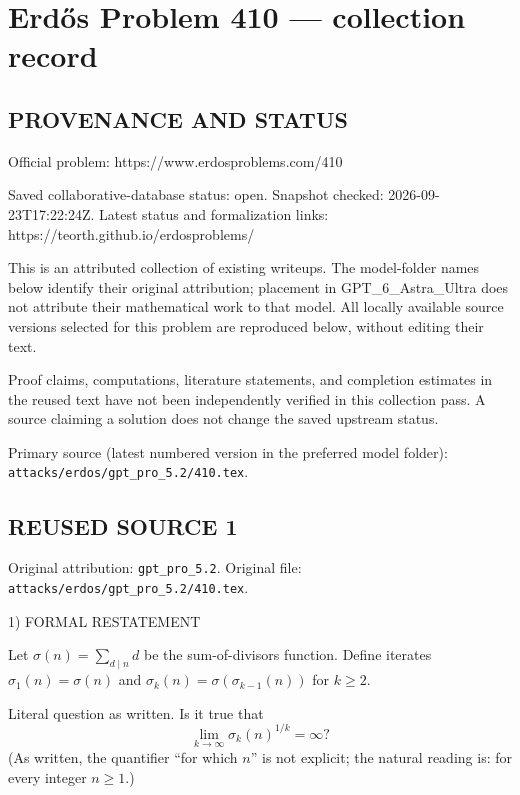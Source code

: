 \section*{Erd\H{o}s Problem 410 --- collection record}

\subsection*{PROVENANCE AND STATUS}
Official problem: https://www.erdosproblems.com/410

Saved collaborative-database status: open.
Snapshot checked: 2026-09-23T17:22:24Z.
Latest status and formalization links: https://teorth.github.io/erdosproblems/

This is an attributed collection of existing writeups. The model-folder names below identify their original attribution; placement in GPT\_6\_Astra\_Ultra does not attribute their mathematical work to that model. All locally available source versions selected for this problem are reproduced below, without editing their text.

Proof claims, computations, literature statements, and completion estimates in the reused text have not been independently verified in this collection pass. A source claiming a solution does not change the saved upstream status.

Primary source (latest numbered version in the preferred model folder): \texttt{attacks/erdos/gpt\_pro\_5.2/410.tex}.

\subsection*{REUSED SOURCE 1}
Original attribution: \texttt{gpt\_pro\_5.2}.
Original file: \texttt{attacks/erdos/gpt\_pro\_5.2/410.tex}.


1) FORMAL RESTATEMENT

Let $\sigma(n)=\sum_{d\mid n} d$ be the sum-of-divisors function.
Define iterates $\sigma_1(n)=\sigma(n)$ and $\sigma_k(n)=\sigma(\sigma_{k-1}(n))$ for $k\ge 2$.

Literal question as written.
Is it true that
\[
\lim_{k\to\infty} \sigma_k(n)^{1/k}=\infty?
\]
(As written, the quantifier “for which $n$” is not explicit; the natural reading is: for every integer $n\ge 1$.)

